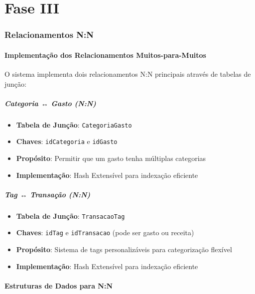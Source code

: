 \documentclass[12pt,a4paper]{article}
\begin{document}
\newpage
\part*{Fase III}

\section{Relacionamentos N:N}

\subsection{Implementação dos Relacionamentos Muitos-para-Muitos}

O sistema implementa dois relacionamentos N:N principais através de tabelas de junção:

\subsubsection*{Categoria ↔ Gasto (N:N)}
\begin{itemize}
  \item \textbf{Tabela de Junção}: \texttt{CategoriaGasto}
  \item \textbf{Chaves}: \texttt{idCategoria} e \texttt{idGasto}
  \item \textbf{Propósito}: Permitir que um gasto tenha múltiplas categorias
  \item \textbf{Implementação}: Hash Extensível para indexação eficiente
\end{itemize}

\subsubsection*{Tag ↔ Transação (N:N)}
\begin{itemize}
  \item \textbf{Tabela de Junção}: \texttt{TransacaoTag}
  \item \textbf{Chaves}: \texttt{idTag} e \texttt{idTransacao} (pode ser gasto ou receita)
  \item \textbf{Propósito}: Sistema de tags personalizáveis para categorização flexível
  \item \textbf{Implementação}: Hash Extensível para indexação eficiente
\end{itemize}

\subsection{Estruturas de Dados para N:N}
\end{document}
